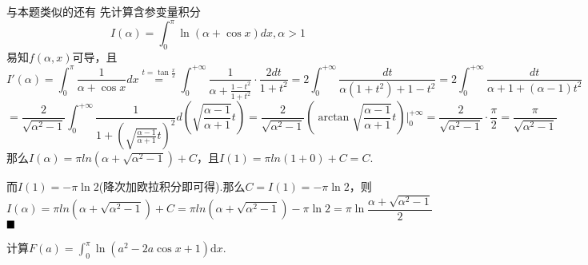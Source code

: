 \documentclass[lang=cn,newtx,10pt,scheme=chinese]{elegantbook}
\begin{document}
\begin{note}
    与本题类似的还有
        先计算含参变量积分$$I(\alpha) = \int _0^{\pi} \ln(\alpha +\cos x)dx,\alpha > 1$$
    易知$f(\alpha,x)$可导，且
    $$ I'(\alpha) = \int_{0}^{\pi} \frac{1}{\alpha + \cos x} dx \stackrel{t=\tan\frac{x}{2}}{=} \int_{0}^{+\infty} \frac{1}{\alpha + \frac{1-t^2}{1+t^2}} \cdot \frac{2 dt}{1+t^2}  = 2 \int_{0}^{+\infty} \frac{dt}{\alpha(1+t^2) + 1-t^2} = 2 \int_{0}^{+\infty} \frac{dt}{\alpha+1 + (\alpha-1)t^2} $$
    $$ = \frac{2}{\sqrt{\alpha^2-1}} \int_{0}^{+\infty} \frac{1}{1 + \left(\sqrt{\frac{\alpha-1}{\alpha+1}}t\right)^2} d\left(\sqrt{\frac{\alpha-1}{\alpha+1}}t\right)  = \frac{2}{\sqrt{\alpha^2-1}} \left( \arctan \sqrt{\frac{\alpha-1}{\alpha+1}}t \right) \Bigg|_{0}^{+\infty} = \frac{2}{\sqrt{\alpha^2-1}} \cdot \frac{\pi}{2} = \frac{\pi}{\sqrt{\alpha^2-1}} $$
    那么$I(\alpha) = \pi ln(\alpha +\sqrt{\alpha^2 -1})+C$，且$I(1)=\pi ln(1+0)+C=C$.

    而$I(1) = -\pi\ln 2$(降次加欧拉积分即可得).那么$C = I(1) = -\pi \ln 2$，则
    $$I(\alpha) = \pi ln(\alpha +\sqrt{\alpha^2 -1})+C= \pi ln(\alpha +\sqrt{\alpha^2 -1})-\pi \ln 2=\pi \ln \frac{\alpha+\sqrt{\alpha^2 -1}}{2}  $$$\hfill \blacksquare$
\end{note}

\begin{example}[$\bigstar$]
    计算$F(a) = \int_0^{\pi} \ln(a^2 -2a \cos x +1) \mathrm{d} x$.
\end{example}
\end{document}

